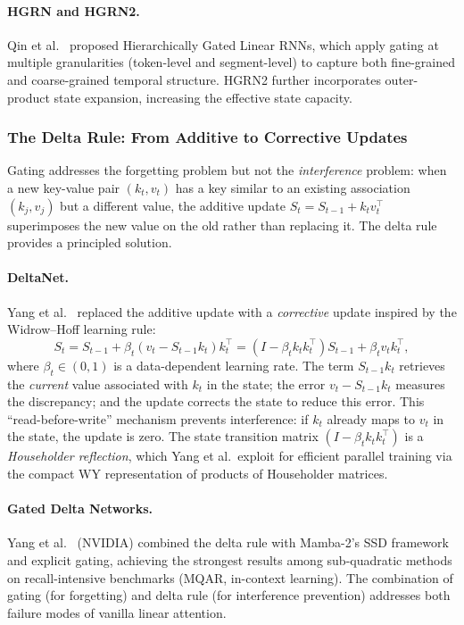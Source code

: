 \documentclass[11pt,a4paper]{article}
\begin{document}
\paragraph{HGRN and HGRN2.}
Qin et al.~\cite{qin2023hgrn, qin2024hgrn2} proposed Hierarchically Gated Linear RNNs, which apply gating at multiple granularities (token-level and segment-level) to capture both fine-grained and coarse-grained temporal structure. HGRN2 further incorporates outer-product state expansion, increasing the effective state capacity.

\subsubsection{The Delta Rule: From Additive to Corrective Updates}

Gating addresses the forgetting problem but not the \emph{interference} problem: when a new key-value pair $(k_t, v_t)$ has a key similar to an existing association $(k_j, v_j)$ but a different value, the additive update $S_t = S_{t-1} + k_t v_t^\top$ superimposes the new value on the old rather than replacing it. The delta rule provides a principled solution.

\paragraph{DeltaNet.}
Yang et al.~\cite{yang2024deltanet} replaced the additive update with a \emph{corrective} update inspired by the Widrow--Hoff learning rule:
\begin{equation}
S_t = S_{t-1} + \beta_t (v_t - S_{t-1} k_t) k_t^\top = (I - \beta_t k_t k_t^\top) S_{t-1} + \beta_t v_t k_t^\top,
\label{eq:deltanet}
\end{equation}
where $\beta_t \in (0, 1)$ is a data-dependent learning rate. The term $S_{t-1} k_t$ retrieves the \emph{current} value associated with $k_t$ in the state; the error $v_t - S_{t-1} k_t$ measures the discrepancy; and the update corrects the state to reduce this error. This ``read-before-write'' mechanism prevents interference: if $k_t$ already maps to $v_t$ in the state, the update is zero. The state transition matrix $(I - \beta_t k_t k_t^\top)$ is a \emph{Householder reflection}, which Yang et al.\ exploit for efficient parallel training via the compact WY representation of products of Householder matrices.

\paragraph{Gated Delta Networks.}
Yang et al.~\cite{yang2024gatedDelta} (NVIDIA) combined the delta rule with Mamba-2's SSD framework and explicit gating, achieving the strongest results among sub-quadratic methods on recall-intensive benchmarks (MQAR, in-context learning). The combination of gating (for forgetting) and delta rule (for interference prevention) addresses both failure modes of vanilla linear attention.
\end{document}
